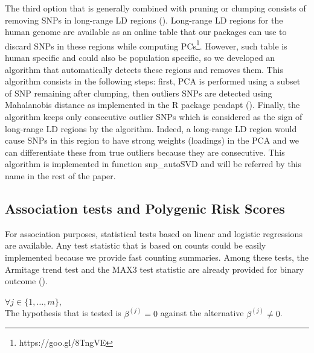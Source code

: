 \documentclass{bioinfo}
\begin{document}
\begin{methods}
The third option that is generally combined with pruning or clumping consists of removing SNPs in long-range LD regions (\cite{Price2008}). Long-range LD regions for the human genome are available as an online table that our packages can use to discard SNPs in these regions while computing PCs\footnote{https://goo.gl/8TngVE}. However, such table is human specific and could also be population specific, so we developed an algorithm that automatically detects these regions and removes them. This algorithm consists in the following steps: first, PCA is performed using a subset of SNP remaining after clumping, then outliers SNPs are detected using Mahalanobis distance as implemented in the R package pcadapt (\cite{Luu2017}). Finally, the algorithm keeps only consecutive outlier SNPs which is considered as the sign of long-range LD regions by the algorithm. Indeed, a long-range LD region would cause SNPs in this region to have strong weights (loadings) in the PCA and we can differentiate these from true outliers because they are consecutive. This algorithm is implemented in function snp\_autoSVD and will be referred by this name in the rest of the paper.


\subsection{Association tests and Polygenic Risk Scores}

For association purposes, statistical tests based on linear and logistic regressions are available. Any test statistic that is based on counts could be easily implemented because we provide fast counting summaries. Among these tests, the Armitage trend test and the MAX3 test statistic are already provided for binary outcome (\cite{Zheng2012}). 

$\forall j \in \{1, \dots, m\}$, 
\\
The hypothesis that is tested is $\beta^{(j)} = 0$ against the alternative $\beta^{(j)} \neq 0$.


\end{methods}
\end{document}
